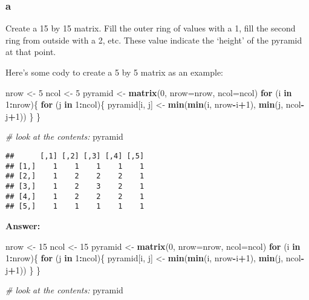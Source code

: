 \documentclass[]{article}
\newenvironment{Shaded}{\begin{snugshade}}{\end{snugshade}}
\newcommand{\CommentTok}[1]{\textcolor[rgb]{0.56,0.35,0.01}{\textit{#1}}}
\newcommand{\ControlFlowTok}[1]{\textcolor[rgb]{0.13,0.29,0.53}{\textbf{#1}}}
\newcommand{\DataTypeTok}[1]{\textcolor[rgb]{0.13,0.29,0.53}{#1}}
\newcommand{\DecValTok}[1]{\textcolor[rgb]{0.00,0.00,0.81}{#1}}
\newcommand{\KeywordTok}[1]{\textcolor[rgb]{0.13,0.29,0.53}{\textbf{#1}}}
\newcommand{\NormalTok}[1]{#1}
\newcommand{\OperatorTok}[1]{\textcolor[rgb]{0.81,0.36,0.00}{\textbf{#1}}}
\newcommand{\StringTok}[1]{\textcolor[rgb]{0.31,0.60,0.02}{#1}}
\begin{document}
\hypertarget{a-7}{%
\subsubsection{a}\label{a-7}}

Create a 15 by 15 matrix. Fill the outer ring of values with a 1, fill
the second ring from outside with a 2, etc. These value indicate the
`height' of the pyramid at that point.

Here's some cody to create a 5 by 5 matrix as an example:

\begin{Shaded}
\begin{Highlighting}[]
\NormalTok{nrow <-}\StringTok{ }\DecValTok{5}
\NormalTok{ncol <-}\StringTok{ }\DecValTok{5}
\NormalTok{pyramid <-}\StringTok{ }\KeywordTok{matrix}\NormalTok{(}\DecValTok{0}\NormalTok{, }\DataTypeTok{nrow=}\NormalTok{nrow, }\DataTypeTok{ncol=}\NormalTok{ncol)}
\ControlFlowTok{for}\NormalTok{ (i }\ControlFlowTok{in} \DecValTok{1}\OperatorTok{:}\NormalTok{nrow)\{}
  \ControlFlowTok{for}\NormalTok{ (j }\ControlFlowTok{in} \DecValTok{1}\OperatorTok{:}\NormalTok{ncol)\{}
\NormalTok{    pyramid[i, j] <-}\StringTok{ }\KeywordTok{min}\NormalTok{(}\KeywordTok{min}\NormalTok{(i, nrow}\OperatorTok{-}\NormalTok{i}\OperatorTok{+}\DecValTok{1}\NormalTok{), }\KeywordTok{min}\NormalTok{(j, ncol}\OperatorTok{-}\NormalTok{j}\OperatorTok{+}\DecValTok{1}\NormalTok{))}
\NormalTok{  \}}
\NormalTok{\}}

\CommentTok{# look at the contents:}
\NormalTok{pyramid}
\end{Highlighting}
\end{Shaded}

\begin{verbatim}
##      [,1] [,2] [,3] [,4] [,5]
## [1,]    1    1    1    1    1
## [2,]    1    2    2    2    1
## [3,]    1    2    3    2    1
## [4,]    1    2    2    2    1
## [5,]    1    1    1    1    1
\end{verbatim}

\textbf{Answer:}

\begin{Shaded}
\begin{Highlighting}[]
\NormalTok{nrow <-}\StringTok{ }\DecValTok{15}
\NormalTok{ncol <-}\StringTok{ }\DecValTok{15}
\NormalTok{pyramid <-}\StringTok{ }\KeywordTok{matrix}\NormalTok{(}\DecValTok{0}\NormalTok{, }\DataTypeTok{nrow=}\NormalTok{nrow, }\DataTypeTok{ncol=}\NormalTok{ncol)}
\ControlFlowTok{for}\NormalTok{ (i }\ControlFlowTok{in} \DecValTok{1}\OperatorTok{:}\NormalTok{nrow)\{}
  \ControlFlowTok{for}\NormalTok{ (j }\ControlFlowTok{in} \DecValTok{1}\OperatorTok{:}\NormalTok{ncol)\{}
\NormalTok{    pyramid[i, j] <-}\StringTok{ }\KeywordTok{min}\NormalTok{(}\KeywordTok{min}\NormalTok{(i, nrow}\OperatorTok{-}\NormalTok{i}\OperatorTok{+}\DecValTok{1}\NormalTok{), }\KeywordTok{min}\NormalTok{(j, ncol}\OperatorTok{-}\NormalTok{j}\OperatorTok{+}\DecValTok{1}\NormalTok{))}
\NormalTok{  \}}
\NormalTok{\}}

\CommentTok{# look at the contents:}
\NormalTok{pyramid}
\end{Highlighting}
\end{Shaded}
\end{document}
